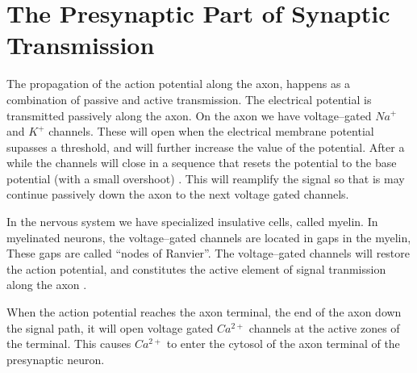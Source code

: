 \section{The Presynaptic Part of Synaptic Transmission}
\label{appendixSecPresynapticSynapticPartOfTransmission}
The propagation of the action potential along the axon, happens as a combination of passive and active transmission.
The electrical potential is transmitted passively along the axon. On the axon we have voltage--gated $Na^+$ and $K^+$ channels.
These will open when the electrical membrane potential supasses a threshold, and will further increase the value of the potential. 
After a while the channels will close in a sequence that resets the potential to the base potential (with a small overshoot) \cite{PrinciplesOfNeuralScience4edKAP09}. 
This will reamplify the signal  so that is may continue passively down the axon to the next voltage gated channels.

In the nervous system we have specialized insulative cells, called myelin.
In myelinated neurons, the voltage--gated channels are located in gaps in the myelin, These gaps are called ``nodes of Ranvier''.
The voltage--gated channels will restore the action potential, and constitutes the active element of signal tranmission along the axon \cite{PrinciplesOfNeuralScience4edKAP09}.



When the action potential reaches the axon terminal, the end of the axon down the signal path, it will open voltage gated $Ca^{2+}$ channels at the active zones of the terminal. 
This causes $Ca^{2+}$ to enter the cytosol of the axon terminal of the presynaptic neuron\cite{PrinciplesOfNeuralScience4edKAP10}.

